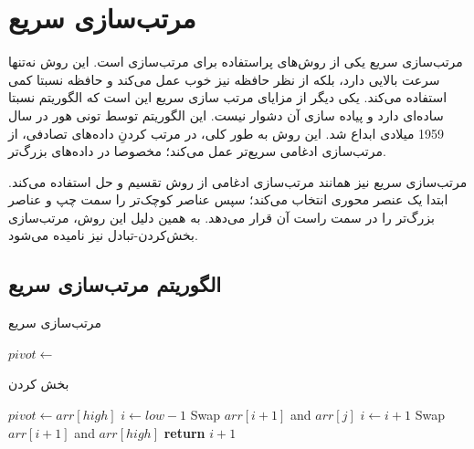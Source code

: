 \documentclass[12pt]{article}
\begin{document}
\section{مرتب‌سازی سریع\protect{}}
مرتب‌سازی سریع یکی از روش‌های پراستفاده برای مرتب‌سازی است.
این روش نه‌تنها سرعت بالایی دارد، بلکه از نظر حافظه نیز خوب عمل می‌کند و حافظه نسبتا کمی استفاده می‌کند.
یکی دیگر از مزایای مرتب سازی سریع این است که الگوریتم نسبتا ساده‌ای دارد
و پیاده سازی آن دشوار نیست.
این الگوریتم توسط تونی هور
در سال 1959 میلادی ابداع شد.\cite{quick0}
این روش به طور کلی، در مرتب کردنِ داده‌های تصادفی، از مرتب‌سازی ادغامی
سریع‌تر عمل می‌کند؛ مخصوصا در داده‌های بزرگ‌تر.\cite{quick1}

مرتب‌سازی سریع نیز همانند مرتب‌سازی ادغامی
از روش تقسیم و حل
استفاده می‌کند.
ابتدا یک عنصر محوری
انتخاب می‌کند؛ سپس عناصر کوچک‌تر را سمت چپ
و عناصر بزرگ‌تر را در سمت راست آن قرار می‌دهد.
به همین دلیل این روش، مرتب‌سازی بخش‌کردن-تبادل
نیز نامیده می‌شود.\cite{quick2}


\subsection*{الگوریتم مرتب‌سازی سریع}
\begin{algorithm}[H]
  \caption{مرتب‌سازی سریع}
  \label{alg:a5}
  \begin{latin}
    \begin{algorithmic}[1]
      \State $pivot \gets$ 
      \State {}
      \State {}
      \EndIf
      \EndProcedure
    \end{algorithmic}
  \end{latin}
\end{algorithm}

\begin{algorithm}[H]
  \caption{بخش کردن}
  \label{alg:a6}
  \begin{latin}
    \begin{algorithmic}[1]
      \State $pivot \gets arr[high]$
      \State $i \gets low - 1$
      \State Swap $arr[i+1]$ and $arr[j]$
      \State $i \gets i + 1$
      \EndIf
      \EndFor
      \State Swap $arr[i+1]$ and $arr[high]$
      \State \textbf{return} $i+1$
      \EndProcedure
    \end{algorithmic}
  \end{latin}
\end{algorithm}

{
\fontsize{12pt}{10pt}\selectfont


}
\end{document}
